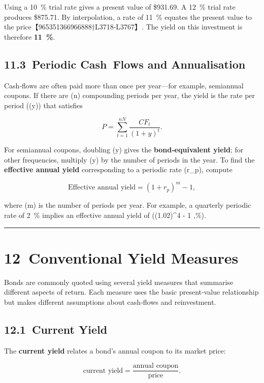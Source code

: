 \documentclass[
  letterpaper,
  DIV=11,
  numbers=noendperiod]{scrartcl}
\begin{document}
Using a 10~\% trial rate gives a present value of \$931.69. A 12~\%
trial rate produces \$875.71. By interpolation, a rate of 11~\% equates
the present value to the price【965351366966888†L3718-L3767】. The yield
on this investment is therefore \textbf{11~\%}.

\subsection{11.3~Periodic Cash~Flows and
Annualisation}\label{periodic-cash-flows-and-annualisation}

Cash‑flows are often paid more than once per year---for example,
semiannual coupons. If there are (n) compounding periods per year, the
yield is the rate per period ((y)) that satisfies

\[
P = \sum_{t=1}^{nN} \frac{CF_t}{(1+y)^t}.
\]

For semiannual coupons, doubling (y) gives the \textbf{bond‑equivalent
yield}; for other frequencies, multiply (y) by the number of periods in
the year. To find the \textbf{effective annual yield} corresponding to a
periodic rate (r\_p), compute

\[
\text{Effective annual yield} = (1 + r_p)^m - 1,
\]

where (m) is the number of periods per year. For example, a quarterly
periodic rate of 2~\% implies an effective annual yield of ((1.02)\^{}4
- 1 ,\%).

\begin{center}\rule{0.5\linewidth}{0.5pt}\end{center}

\section{12~Conventional Yield
Measures}\label{conventional-yield-measures}

Bonds are commonly quoted using several yield measures that summarise
different aspects of return. Each measure uses the basic present‑value
relationship but makes different assumptions about cash‑flows and
reinvestment.

\subsection{12.1~Current Yield}\label{current-yield}

The \textbf{current yield} relates a bond's annual coupon to its market
price:

\[
\text{current yield} = \frac{\text{annual coupon}}{\text{price}}.
\]
\end{document}
